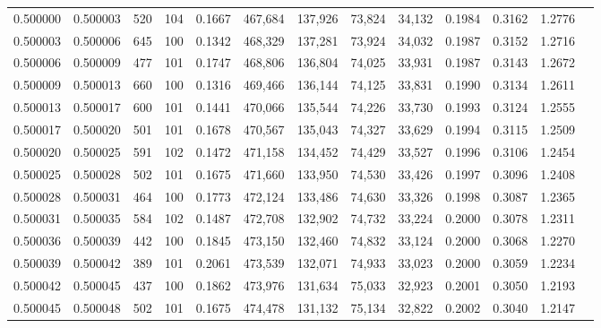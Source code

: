 \begin{tabular}{rrrrrrrrrrrrr}
0.500000 & 0.500003 &   520 & 104 &                                     0.1667 & 467,684 & 137,926 &  73,824 &  34,132 & 0.1984 & 0.3162 & 1.2776 \\
0.500003 & 0.500006 &   645 & 100 &                                     0.1342 & 468,329 & 137,281 &  73,924 &  34,032 & 0.1987 & 0.3152 & 1.2716 \\
0.500006 & 0.500009 &   477 & 101 &                                     0.1747 & 468,806 & 136,804 &  74,025 &  33,931 & 0.1987 & 0.3143 & 1.2672 \\
0.500009 & 0.500013 &   660 & 100 &                                     0.1316 & 469,466 & 136,144 &  74,125 &  33,831 & 0.1990 & 0.3134 & 1.2611 \\
0.500013 & 0.500017 &   600 & 101 &                                     0.1441 & 470,066 & 135,544 &  74,226 &  33,730 & 0.1993 & 0.3124 & 1.2555 \\
0.500017 & 0.500020 &   501 & 101 &                                     0.1678 & 470,567 & 135,043 &  74,327 &  33,629 & 0.1994 & 0.3115 & 1.2509 \\
0.500020 & 0.500025 &   591 & 102 &                                     0.1472 & 471,158 & 134,452 &  74,429 &  33,527 & 0.1996 & 0.3106 & 1.2454 \\
0.500025 & 0.500028 &   502 & 101 &                                     0.1675 & 471,660 & 133,950 &  74,530 &  33,426 & 0.1997 & 0.3096 & 1.2408 \\
0.500028 & 0.500031 &   464 & 100 &                                     0.1773 & 472,124 & 133,486 &  74,630 &  33,326 & 0.1998 & 0.3087 & 1.2365 \\
0.500031 & 0.500035 &   584 & 102 &                                     0.1487 & 472,708 & 132,902 &  74,732 &  33,224 & 0.2000 & 0.3078 & 1.2311 \\
0.500036 & 0.500039 &   442 & 100 &                                     0.1845 & 473,150 & 132,460 &  74,832 &  33,124 & 0.2000 & 0.3068 & 1.2270 \\
0.500039 & 0.500042 &   389 & 101 &                                     0.2061 & 473,539 & 132,071 &  74,933 &  33,023 & 0.2000 & 0.3059 & 1.2234 \\
0.500042 & 0.500045 &   437 & 100 &                                     0.1862 & 473,976 & 131,634 &  75,033 &  32,923 & 0.2001 & 0.3050 & 1.2193 \\
0.500045 & 0.500048 &   502 & 101 &                                     0.1675 & 474,478 & 131,132 &  75,134 &  32,822 & 0.2002 & 0.3040 & 1.2147 \\

\end{tabular}
